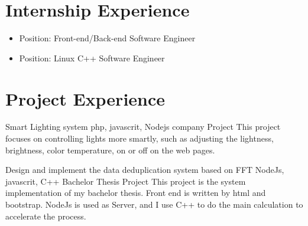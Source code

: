 \documentclass[11pt,a4paper]{moderncv}
\begin{document}


\section{Internship Experience}
{
\begin{itemize}
\item Position: Front-end/Back-end Software Engineer
\end{itemize}
}

{
\begin{itemize}
\item Position: Linux C++ Software Engineer
\end{itemize}
}

\section{Project Experience}
\vspace*{0.2\baselineskip}
{Smart Lighting system}
{php, javascrit, Nodejs}
{company Project}
{}
{
This project focuses on controlling lights more smartly, such as adjusting the lightness, brightness, color temperature, on or off on the web pages. 
}

\vspace*{0.2\baselineskip}
{Design and implement the data deduplication system based on FFT}
{NodeJs, javascrit, C++}
{Bachelor Thesis Project}
{}
{
This project is the system implementation of my bachelor thesis. Front end is written by html and bootstrap. NodeJs is used as Server, and I use C++ to do the main calculation to accelerate the process.
}
\end{document}
